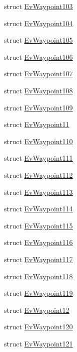 \begin{DoxyCompactItemize}
struct \hyperlink{structcl__move__base__z_1_1EvWaypoint103}{Ev\+Waypoint103}
\item 
struct \hyperlink{structcl__move__base__z_1_1EvWaypoint104}{Ev\+Waypoint104}
\item 
struct \hyperlink{structcl__move__base__z_1_1EvWaypoint105}{Ev\+Waypoint105}
\item 
struct \hyperlink{structcl__move__base__z_1_1EvWaypoint106}{Ev\+Waypoint106}
\item 
struct \hyperlink{structcl__move__base__z_1_1EvWaypoint107}{Ev\+Waypoint107}
\item 
struct \hyperlink{structcl__move__base__z_1_1EvWaypoint108}{Ev\+Waypoint108}
\item 
struct \hyperlink{structcl__move__base__z_1_1EvWaypoint109}{Ev\+Waypoint109}
\item 
struct \hyperlink{structcl__move__base__z_1_1EvWaypoint11}{Ev\+Waypoint11}
\item 
struct \hyperlink{structcl__move__base__z_1_1EvWaypoint110}{Ev\+Waypoint110}
\item 
struct \hyperlink{structcl__move__base__z_1_1EvWaypoint111}{Ev\+Waypoint111}
\item 
struct \hyperlink{structcl__move__base__z_1_1EvWaypoint112}{Ev\+Waypoint112}
\item 
struct \hyperlink{structcl__move__base__z_1_1EvWaypoint113}{Ev\+Waypoint113}
\item 
struct \hyperlink{structcl__move__base__z_1_1EvWaypoint114}{Ev\+Waypoint114}
\item 
struct \hyperlink{structcl__move__base__z_1_1EvWaypoint115}{Ev\+Waypoint115}
\item 
struct \hyperlink{structcl__move__base__z_1_1EvWaypoint116}{Ev\+Waypoint116}
\item 
struct \hyperlink{structcl__move__base__z_1_1EvWaypoint117}{Ev\+Waypoint117}
\item 
struct \hyperlink{structcl__move__base__z_1_1EvWaypoint118}{Ev\+Waypoint118}
\item 
struct \hyperlink{structcl__move__base__z_1_1EvWaypoint119}{Ev\+Waypoint119}
\item 
struct \hyperlink{structcl__move__base__z_1_1EvWaypoint12}{Ev\+Waypoint12}
\item 
struct \hyperlink{structcl__move__base__z_1_1EvWaypoint120}{Ev\+Waypoint120}
\item 
struct \hyperlink{structcl__move__base__z_1_1EvWaypoint121}{Ev\+Waypoint121}
\item 

\end{DoxyCompactItemize}
